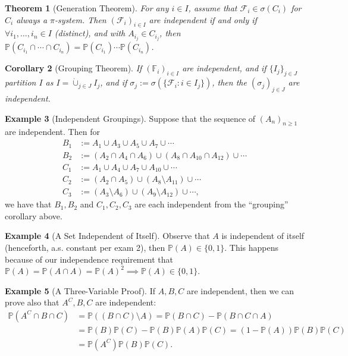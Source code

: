 \documentclass[12pt,reqno]{article}
\theoremstyle{plain}
\newtheorem{theorem}{Theorem}[section]
\newtheorem{cor}[theorem]{Corollary}
\theoremstyle{definition}
\newtheorem{example}[theorem]{Example}
\newcommand{\PP}[1]{\ensuremath{\mathbb{P}\left(#1\right)}}
\begin{document}
\begin{theorem}[Generation Theorem] 
For any $i \in I$, assume that $\mathcal{F}_i \in \sigma(C_i)$ for $C_i$ always a $\pi$-system. 
Then $(\mathcal{F}_i)_{i \in I}$ are independent if and only if $\forall i_1,\ldots,i_n \in I$ 
(distinct), and with $A_{i_j} \in C_{i_j}$, then 
$\PP{C_{i_1} \cap \cdots \cap C_{i_n}} = \PP{C_{i_1}} \cdots \PP{C_{i_n}}$. 
\end{theorem} 

\begin{cor}[Grouping Theorem] 
If $(\mathbb{F}_i)_{i \in I}$ are independent, and if $\{I_j\}_{j \in J}$ partition $I$ as 
$I = \dot{\cup}_{j \in J} I_j$, and if $\sigma_j := \sigma(\{\mathcal{F}_i: i \in I_j\})$, 
then the $(\sigma_j)_{j \in J}$ are independent. 
\end{cor} 

\begin{example}[Independent Groupings] 
Suppose that the sequence of $(A_n)_{n \geq 1}$ are independent. Then for 
\begin{align*} 
B_1 & := A_1 \cup A_3 \cup A_5 \cup A_7 \cup \cdots \\ 
B_2 & := (A_2 \cap A_4 \cap A_6) \cup (A_8 \cap A_{10} \cap A_{12}) \cup \cdots \\ 
C_1 & := A_1 \cup A_4 \cup A_7 \cup A_{10} \cup \cdots \\ 
C_2 & := (A_2 \cap A_5) \cup (A_8 \setminus A_{11}) \cup \cdots \\ 
C_3 & := (A_3 \setminus A_6) \cup (A_9 \setminus A_{12}) \cup \cdots , 
\end{align*} 
we have that $B_1,B_2$ and $C_1,C_2,C_3$ are each independent from the ``grouping'' 
corollary above. 
\end{example} 

\begin{example}[A Set Independent of Itself] 
Observe that $A$ is independent of itself (henceforth, a.s. constant per exam 2), then 
$\PP{A} \in \{0,1\}$. This happens because of our independence requirement that 
$\PP{A} = \PP{A \cap A} = \PP{A}^2 \implies \PP{A} \in \{0,1\}$. 
\end{example} 

\begin{example}[A Three-Variable Proof] 
If $A,B,C$ are independent, then we can prove also that $A^C,B,C$ are independent: 
\begin{align*} 
\PP{A^C \cap B \cap C} & = \PP{(B \cap C) \setminus A} = \PP{B \cap C} - \PP{B \cap C \cap A} \\ 
     & = \PP{B} \PP{C} - \PP{B} \PP{A} \PP{C} = (1-\PP{A}) \PP{B} \PP{C} \\ 
     & = \PP{A^C} \PP{B} \PP{C}. 
\end{align*} 
\end{example} 
\end{document}
